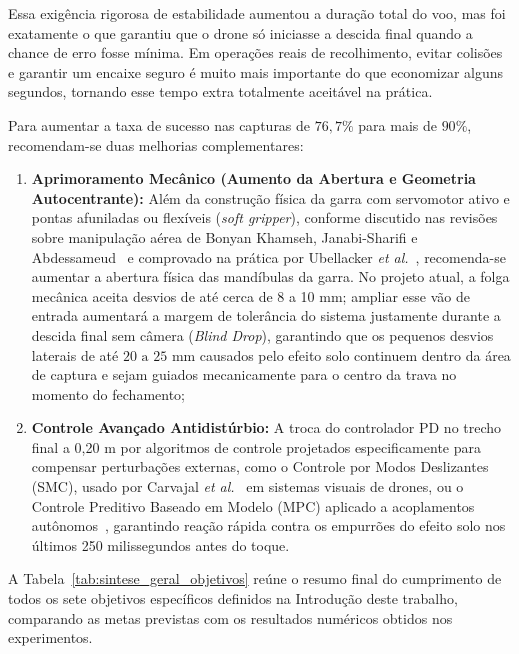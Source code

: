 Essa exigência rigorosa de estabilidade aumentou a duração total do voo, mas foi exatamente o que garantiu que o drone só iniciasse a descida final quando a chance de erro fosse mínima. Em operações reais de recolhimento, evitar colisões e garantir um encaixe seguro é muito mais importante do que economizar alguns segundos, tornando esse tempo extra totalmente aceitável na prática.


Para aumentar a taxa de sucesso nas capturas de $76{,}7\%$ para mais de $90\%$, recomendam-se duas melhorias complementares:
\begin{enumerate}
	\item \textbf{Aprimoramento Mecânico (Aumento da Abertura e Geometria Autocentrante):} Além da construção física da garra com servomotor ativo e pontas afuniladas ou flexíveis (\textit{soft gripper}), conforme discutido nas revisões sobre manipulação aérea de Bonyan Khamseh, Janabi-Sharifi e Abdessameud~\cite{bonyan2018} e comprovado na prática por Ubellacker \textit{et al.}~\cite{ubellacker2024}, recomenda-se aumentar a abertura física das mandíbulas da garra. No projeto atual, a folga mecânica aceita desvios de até cerca de 8 a 10 mm; ampliar esse vão de entrada aumentará a margem de tolerância do sistema justamente durante a descida final sem câmera (\textit{Blind Drop}), garantindo que os pequenos desvios laterais de até $20\text{ a } 25\text{ mm}$ causados pelo efeito solo continuem dentro da área de captura e sejam guiados mecanicamente para o centro da trava no momento do fechamento;
	
	\item \textbf{Controle Avançado Antidistúrbio:} A troca do controlador PD no trecho final a 0,20 m por algoritmos de controle projetados especificamente para compensar perturbações externas, como o Controle por Modos Deslizantes (SMC), usado por Carvajal \textit{et al.}~\cite{carvajal2024} em sistemas visuais de drones, ou o Controle Preditivo Baseado em Modelo (MPC) aplicado a acoplamentos autônomos~\cite{pramono2025}, garantindo reação rápida contra os empurrões do efeito solo nos últimos 250 milissegundos antes do toque.
\end{enumerate}


A Tabela~\ref{tab:sintese_geral_objetivos} reúne o resumo final do cumprimento de todos os sete objetivos específicos definidos na Introdução deste trabalho, comparando as metas previstas com os resultados numéricos obtidos nos experimentos.


